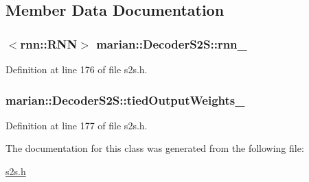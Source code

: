 \subsection{Member Data Documentation}
\subsubsection[{\texorpdfstring{rnn\+\_\+}{rnn_}}]{$<$rnn\+::\+R\+NN$>$ marian\+::\+Decoder\+S2\+S\+::rnn\+\_\+\hspace{0.3cm}{\ttfamily [private]}}\hypertarget{classmarian_1_1DecoderS2S_aa4292be54117f5fc7bee31fac549a93c}{}\label{classmarian_1_1DecoderS2S_aa4292be54117f5fc7bee31fac549a93c}


Definition at line 176 of file s2s.\+h.

\subsubsection[{\texorpdfstring{tied\+Output\+Weights\+\_\+}{tiedOutputWeights_}}]{ marian\+::\+Decoder\+S2\+S\+::tied\+Output\+Weights\+\_\+\hspace{0.3cm}{\ttfamily [private]}}\hypertarget{classmarian_1_1DecoderS2S_afdcd53fd8c14663b24af51651e8e3e6e}{}\label{classmarian_1_1DecoderS2S_afdcd53fd8c14663b24af51651e8e3e6e}


Definition at line 177 of file s2s.\+h.



The documentation for this class was generated from the following file\+:\begin{DoxyCompactItemize}
\item 
\hyperlink{s2s_8h}{s2s.\+h}\end{DoxyCompactItemize}
